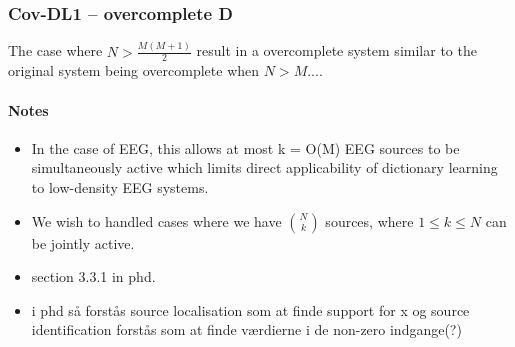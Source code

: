 \subsubsection*{Cov-DL1 -- overcomplete \textbf{D}}
The case where $N > \frac{M(M+1)}{2}$ result in a overcomplete system similar to the original system being overcomplete when $N>M$....   

\paragraph{Notes}

\begin{itemize}
\item In the case of EEG, this allows at most k = O(M) EEG sources to be simultaneously active which limits direct applicability of dictionary learning to low-density EEG systems.
\item We wish to handled cases where we have $\binom{N}{k}$ sources, where $1 \leq k \leq N$ can be jointly active.
\item section 3.3.1 in phd.
\item i phd så forstås source localisation som at finde support for x og source identification forstås som at finde værdierne i de non-zero indgange(?)

\end{itemize}

